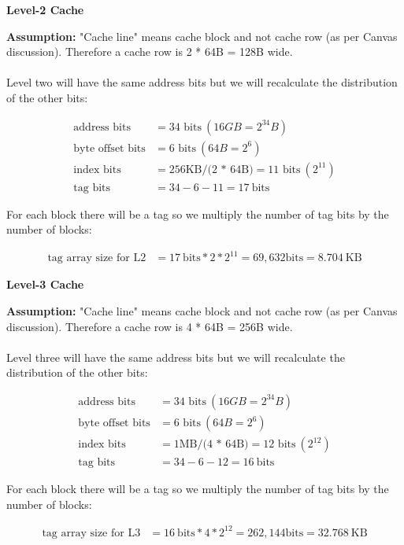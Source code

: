 \documentclass[a4paper, 11pt]{exam}
\begin{document}
\begin{enumerate}
\textbf{Level-2 Cache}

\textbf{Assumption:} "Cache line" means cache block and not cache row (as per Canvas discussion). Therefore a cache row is 2 * 64B = 128B wide.\\ \\
Level two will have the same address bits but we will recalculate the distribution of the other bits:

\begin{align*}
\text{address bits} &= \text{34 bits} \  (16GB = 2^{34} B) \\
\text{byte offset bits} &= \text{6 bits} \ (64B = 2^6) \\
\text{index bits} &= \text{256KB/(2 * 64B)} = \text{11 bits} \ (2^{11})\\
\text{tag bits} &= 34 - 6 - 11 =  17 \ \text{bits}         
\end{align*}

For each block there will be a tag so we multiply the number of tag bits by the number of blocks:

\begin{align*}
\text{tag array size for L2} &= 17 \ \text{bits} * 2 * 2^{11} = 69,632 \text{bits} = 8.704 \ \text{KB} 	
\end{align*}

\textbf{Level-3 Cache}

\textbf{Assumption:} "Cache line" means cache block and not cache row (as per Canvas discussion). Therefore a cache row is 4 * 64B = 256B wide.\\ \\

Level three will have the same address bits but we will recalculate the distribution of the other bits:

\begin{align*}
\text{address bits} &= \text{34 bits} \  (16GB = 2^{34} B) \\
\text{byte offset bits} &= \text{6 bits} \ (64B = 2^6) \\
\text{index bits} &= \text{1MB/(4 * 64B)} = \text{12 bits} \ (2^{12})\\
\text{tag bits} &= 34 - 6 - 12 =  16 \ \text{bits}         
\end{align*}

For each block there will be a tag so we multiply the number of tag bits by the number of blocks:

\begin{align*}
\text{tag array size for L3} &= 16 \ \text{bits} * 4 * 2^{12} = 262,144 \text{bits} = 32.768 \ \text{KB} 	
\end{align*}


\end{enumerate}
\end{document}
